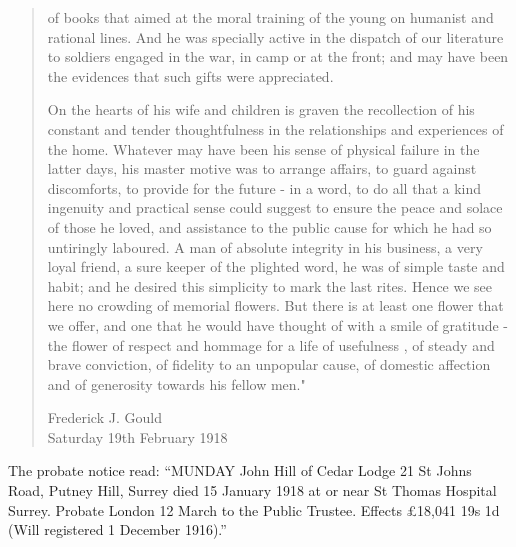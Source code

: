 \begin{quotation}
of books that aimed at the moral training of the young on humanist and rational lines. And he was specially active in the dispatch of our literature to soldiers engaged in the war, in camp or at the front; and may have been the evidences that such gifts were appreciated.

On the hearts of his wife and children is graven the recollection of his constant and tender thoughtfulness in the relationships and experiences of the home. Whatever may have been his sense of physical failure in the latter days, his master motive was to arrange affairs, to guard against discomforts, to provide for the future - in a word, to do all that a kind ingenuity and practical sense could suggest to ensure the peace and solace of those he loved, and assistance to the public cause for which he had so untiringly laboured. A man of absolute integrity in his business, a very loyal friend, a sure keeper of the plighted word, he was of simple taste and habit; and he desired this simplicity to mark the last rites. Hence we see here no crowding of memorial flowers. But there is at least one flower that we offer, and one that he would have thought of with a smile of gratitude - the flower of respect and hommage for a life of usefulness , of steady and brave conviction, of fidelity to an unpopular cause, of domestic affection and of generosity towards his fellow men."

Frederick J. Gould \\
Saturday 19th February 1918
\end{quotation}

The probate notice read: ``MUNDAY John Hill of Cedar Lodge 21 St Johns Road, Putney Hill, Surrey died 15 January 1918 at or near St Thomas Hospital Surrey. Probate London 12 March to the Public Trustee. Effects \pounds18,041 19s 1d (Will registered 1 December 1916).''\cite{NationalProbateCalendar}
